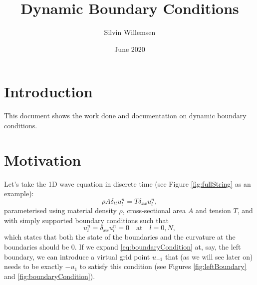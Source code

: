 \documentclass[dvipsnames]{article}
\title{Dynamic Boundary Conditions}
\author{Silvin Willemsen}
\date{June 2020}
\begin{document}
\maketitle

\section{Introduction}
This document shows the work done and documentation on dynamic boundary conditions.
 
\section{Motivation}
Let's take the 1D wave equation in discrete time (see Figure \ref{fig:fullString} as an example):
\begin{equation}\label{eq:1Dwave}
    \rho A\delta_{tt}u_l^n=T\delta_{xx}u_l^n,
\end{equation}
parameterised using material density $\rho$, cross-sectional area $A$ and tension $T$, and with simply supported boundary conditions such that
\begin{equation}\label{eq:boundaryCondition}
u_l^n = \delta_{xx}u_l^n = 0 \quad \text{at} \quad l = 0, N,
\end{equation}
which states that both the state of the boundaries and the curvature at the boundaries should be 0. If we expand \eqref{eq:boundaryCondition} at, say, the left boundary, we can introduce a virtual grid point $u_{-1}$ that (as we will see later on) needs to be exactly $-u_1$ to satisfy this condition (see Figures \ref{fig:leftBoundary} and \ref{fig:boundaryCondition}).
\end{document}
